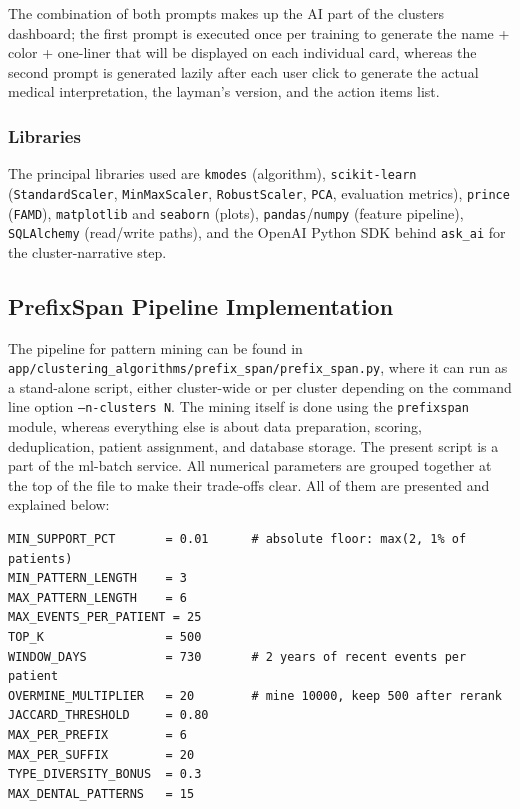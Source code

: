 \noindent The combination of both prompts makes up the AI part of the clusters dashboard; the first prompt is executed once per training to generate the name + color + one-liner that will be displayed on each individual card, whereas the second prompt is generated lazily after each user click to generate the actual medical interpretation, the layman’s version, and the action items list.

\subsubsection*{Libraries}

The principal libraries used are \texttt{kmodes} (algorithm), \texttt{scikit-learn} (\texttt{StandardScaler}, \texttt{MinMaxScaler}, \texttt{RobustScaler}, \texttt{PCA}, evaluation metrics), \texttt{prince} (\texttt{FAMD}), \texttt{matplotlib} and \texttt{seaborn} (plots), \texttt{pandas}/\texttt{numpy} (feature pipeline), \texttt{SQLAlchemy} (read/write paths), and the OpenAI Python SDK behind \texttt{ask\_ai} for the cluster-narrative step.

\subsection{PrefixSpan Pipeline Implementation}

The pipeline for pattern mining can be found in \texttt{app/\allowbreak clustering\_\allowbreak algorithms/\allowbreak prefix\_\allowbreak span/\allowbreak prefix\_\allowbreak span.py}, where it can run as a stand-alone script, either cluster-wide or per cluster depending on the command line option \texttt{--n-clusters N}. The mining itself is done using the \texttt{prefixspan} module, whereas everything else is about data preparation, scoring, deduplication, patient assignment, and database storage. The present script is a part of the ml-batch service. All numerical parameters are grouped together at the top of the file to make their trade-offs clear. All of them are presented and explained below:

\begin{lstlisting}[style=pythonstyle]
MIN_SUPPORT_PCT       = 0.01      # absolute floor: max(2, 1% of patients)
MIN_PATTERN_LENGTH    = 3
MAX_PATTERN_LENGTH    = 6
MAX_EVENTS_PER_PATIENT = 25
TOP_K                 = 500
WINDOW_DAYS           = 730       # 2 years of recent events per patient
OVERMINE_MULTIPLIER   = 20        # mine 10000, keep 500 after rerank
JACCARD_THRESHOLD     = 0.80
MAX_PER_PREFIX        = 6
MAX_PER_SUFFIX        = 20
TYPE_DIVERSITY_BONUS  = 0.3
MAX_DENTAL_PATTERNS   = 15

\end{lstlisting}

